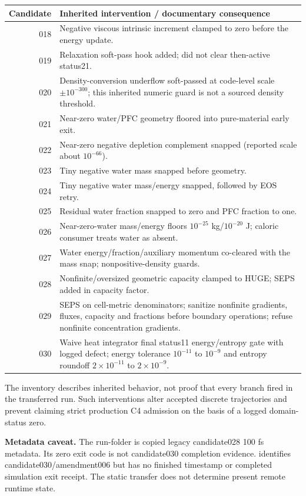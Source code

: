 \documentclass[10pt,a4paper]{article}
\begin{document}
\begin{longtable}{rp{.80\linewidth}}\toprule
Candidate & Inherited intervention / documentary consequence\\\midrule\endhead
018 & Negative viscous intrinsic increment clamped to zero before the energy update.\\
019 & Relaxation soft-pass hook added; did not clear then-active status21.\\
020 & Density-conversion underflow soft-passed at code-level scale $\pm10^{-300}$; this inherited numeric guard is not a sourced density threshold.\\
021 & Near-zero water/PFC geometry floored into pure-material early exit.\\
022 & Near-zero negative depletion complement snapped (reported scale about $10^{-66}$).\\
023 & Tiny negative water mass snapped before geometry.\\
024 & Tiny negative water mass/energy snapped, followed by EOS retry.\\
025 & Residual water fraction snapped to zero and PFC fraction to one.\\
026 & Near-zero-water mass/energy floors $10^{-25}$ kg/$10^{-20}$ J; caloric consumer treats water as absent.\\
027 & Water energy/fraction/auxiliary momentum co-cleared with the mass snap; nonpositive-density guards.\\
028 & Nonfinite/oversized geometric capacity clamped to HUGE; SEPS added in capacity factor.\\
029 & SEPS on cell-metric denominators; sanitize nonfinite gradients, fluxes, capacity and fractions before boundary operations; refuse nonfinite concentration gradients.\\
030 & Waive heat integrator final status11 energy/entropy gate with logged defect; energy tolerance $10^{-11}$ to $10^{-9}$ and entropy roundoff $2\times10^{-11}$ to $2\times10^{-9}$.\\\bottomrule
\end{longtable}
The inventory describes inherited behavior, not proof that every branch fired in the transferred run. Such interventions alter accepted discrete trajectories and prevent claiming strict production C4 admission on the basis of a logged domain-status zero.

\textbf{Metadata caveat.} The run-folder  is copied legacy candidate028 100 fs metadata. Its zero exit code is not candidate030 completion evidence.  identifies candidate030/amendment006 but has no finished timestamp or completed simulation exit receipt. The static transfer does not determine present remote runtime state.
\end{document}
